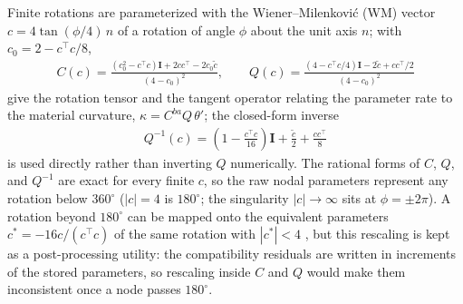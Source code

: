 \documentclass[10pt]{article}
\newcommand{\mbf}[1]{\mathbf{#1}}
\newcommand{\beq}{\begin{equation}\begin{aligned}}
\newcommand{\eeq}{\end{aligned}\end{equation}}
\begin{document}
Finite rotations are parameterized with the Wiener--Milenkovi\'c (\ac{WM}) vector $c = 4\tan(\phi/4)\,n$ of a rotation of angle $\phi$ about the unit axis $n$; with $c_0 = 2-c^\top c/8$,
\beq
C(c) = \frac{(c_0^2-c^\top c)\mbf{I} + 2cc^\top - 2c_0\tilde c}{(4-c_0)^2}, \qquad
Q(c) = \frac{(4-c^\top c/4)\mbf{I} - 2\tilde c + cc^\top/2}{(4-c_0)^2}
\label{eqn:StrainBeamWM}
\eeq
give the rotation tensor and the tangent operator relating the parameter rate to the material curvature, $\kappa = C^{ba}Q\,\theta'$; the closed-form inverse
\beq
Q^{-1}(c) = \left(1-\frac{c^\top c}{16}\right)\mbf{I} + \frac{\tilde c}{2} + \frac{cc^\top}{8}
\label{eqn:StrainBeamWMInverse}
\eeq
is used directly rather than inverting $Q$ numerically.
The rational forms of $C$, $Q$, and $Q^{-1}$ are exact for every finite $c$, so the raw nodal parameters represent any rotation below $360^\circ$ ($|c|=4$ is $180^\circ$; the singularity $|c|\to\infty$ sits at $\phi=\pm2\pi$).
A rotation beyond $180^\circ$ can be mapped onto the equivalent parameters $c^* = -16c/(c^\top c)$ of the same rotation with $|c^*|<4$ \citep{Bauchau2003,Bauchau2011}, but this rescaling is kept as a post-processing utility: the compatibility residuals are written in increments of the stored parameters, so rescaling inside $C$ and $Q$ would make them inconsistent once a node passes $180^\circ$.
\end{document}
